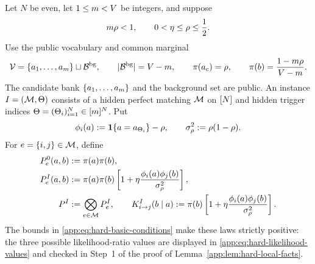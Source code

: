 \begin{definition}
\label{app:def:hard-matching-family}
Let $N$ be even, let
$1\le m<V$ be integers, and suppose
\begin{equation}
 m\rho<1,
 \qquad
 0<\eta\le\rho\le\frac12.
 \label{app:eq:hard-basic-conditions}
\end{equation}
Use the public vocabulary and common marginal
\begin{equation}
 \mathcal V=\{a_{1},\ldots,a_{m}\}
        \sqcup\mathcal B^{\mathrm{bg}},
 \qquad |\mathcal B^{\mathrm{bg}}|=V-m,
 \qquad
 \pi(a_{c})=\rho,
 \qquad
 \pi(b)=
 \frac{1-m\rho}
      {V-m}.
 \label{app:eq:hard-common-marginal}
\end{equation}
The candidate bank
$\{a_{1},\ldots,a_{m}\}$ and the
background set are public.  An instance
$I=(\mathcal M,\Theta)$ consists of a hidden perfect matching
$\mathcal M$ on $[N]$ and hidden trigger indices
$\Theta=(\Theta_{i})_{i=1}^N
\in[m]^N$.  Put
\begin{equation}
 \phi_{i}(a)
 :=\mathbf 1\{a=a_{\Theta_{i}}\}-\rho,
 \qquad
 \sigma_\rho^2:=\rho(1-\rho).
 \label{app:eq:hard-features}
\end{equation}
For $e=\{i,j\}\in\mathcal M$, define
\begin{align}
 P_{e}^{0}(a,b)
 &:=\pi(a)\pi(b),
 \label{app:eq:hard-independent-edge-law}\\
 P_{e}^{I}(a,b)
 &:=\pi(a)\pi(b)
 \left[1+\eta
 \frac{\phi_{i}(a)\phi_{j}(b)}{\sigma_\rho^2}\right],
 \label{app:eq:hard-edge-law}\\
 P^{I}&:=\bigotimes_{e\in\mathcal M}P_{e}^{I},
 \qquad
 K_{i\to j}^{I}(b\mid a)
 :=\pi(b)
 \left[1+\eta
 \frac{\phi_{i}(a)\phi_{j}(b)}{\sigma_\rho^2}\right].
 \label{app:eq:hard-target-and-kernel}
\end{align}
The bounds in \eqref{app:eq:hard-basic-conditions} make these laws strictly
positive: the three possible likelihood-ratio values are displayed in
\eqref{app:eq:hard-likelihood-values} and checked in Step~1 of the proof of
Lemma~\ref{app:lem:hard-local-facts}.

\end{definition}
